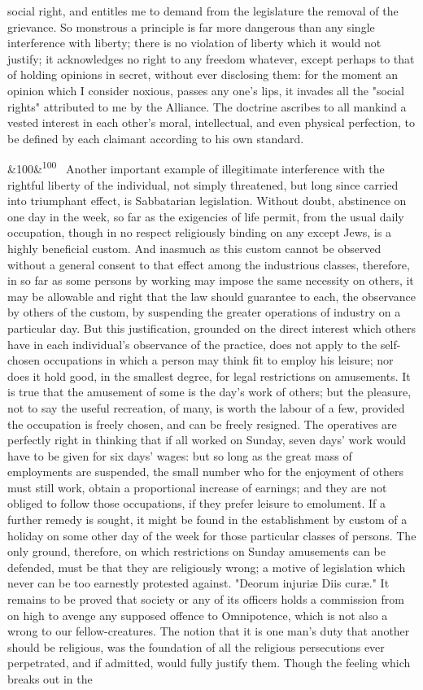 \documentclass[12pt]{article}
\newcommand{\para}[1][]{\par\noindent\ifx&#1&\else\textsuperscript{\footnotesize #1}~\fi}
\begin{document}
social right, and entitles me to demand from the legislature the removal of the grievance. So monstrous a principle is far more dangerous than any single interference with liberty; there is no violation of liberty which it would not justify; it acknowledges no right to any freedom whatever, except perhaps to that of holding opinions in secret, without ever disclosing them: for the moment an opinion which I consider noxious, passes any one's lips, it invades all the "social rights" attributed to me by the Alliance. The doctrine ascribes to all mankind a vested interest in each other's moral, intellectual, and even physical perfection, to be defined by each claimant according to his own standard.

\para[100] Another important example of illegitimate interference with the rightful liberty of the individual, not simply threatened, but long since carried into triumphant effect, is Sabbatarian legislation. Without doubt, abstinence on one day in the week, so far as the exigencies of life permit, from the usual daily occupation, though in no respect religiously binding on any except Jews, is a highly beneficial custom. And inasmuch as this custom cannot be observed without a general consent to that effect among the industrious classes, therefore, in so far as some persons by working may impose the same necessity on others, it may be allowable and right that the law should guarantee to each, the observance by others of the custom, by suspending the greater operations of industry on a particular day. But this justification, grounded on the direct interest which others have in each individual's observance of the practice, does not apply to the self-chosen occupations in which a person may think fit to employ his leisure; nor does it hold good, in the smallest degree, for legal restrictions on amusements. It is true that the amusement of some is the day's work of others; but the pleasure, not to say the useful recreation, of many, is worth the labour of a few, provided the occupation is freely chosen, and can be freely resigned. The operatives are perfectly right in thinking that if all worked on Sunday, seven days' work would have to be given for six days' wages: but so long as the great mass of employments are suspended, the small number who for the enjoyment of others must still work, obtain a proportional increase of earnings; and they are not obliged to follow those occupations, if they prefer leisure to emolument. If a further remedy is sought, it might be found in the establishment by custom of a holiday on some other day of the week for those particular classes of persons. The only ground, therefore, on which restrictions on Sunday amusements can be defended, must be that they are religiously wrong; a motive of legislation which never can be too earnestly protested against. "Deorum injuriæ Diis curæ." It remains to be proved that society or any of its officers holds a commission from on high to avenge any supposed offence to Omnipotence, which is not also a wrong to our fellow-creatures. The notion that it is one man's duty that another should be religious, was the foundation of all the religious persecutions ever perpetrated, and if admitted, would fully justify them. Though the feeling which breaks out in the 
\end{document}
